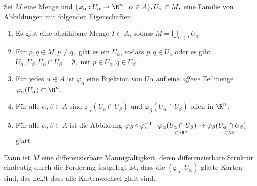 \begin{lem}
	Sei $M$ eine Menge und $ \{\varphi_\alpha: U_\alpha \to \R^n \mid \alpha \in A\}, U_\alpha \subset M, $ eine Familie von Abbildungen mit folgenden Eigenschaften:
	\begin{enumerate}[label={\roman*})]
		\item Es gibt eine abzählbare Menge $ I \subset A $, sodass $ M = \bigcup\limits_{\alpha \in I}U_\alpha. $
		\item Für $ p,q \in M, p \neq q, $ gibt es ein $ U_\alpha $, sodass $ p,q \in U_\alpha $ oder es gibt $ U_\alpha,U_\beta, U_\alpha \cap U_\beta = \emptyset, $ mit $ p \in U_\alpha, q \in U_\beta. $
		\item Für jedes $ \alpha \in A $ ist $ \varphi_\alpha $ eine Bijektion von $ U\alpha $ auf eine \emph{offene} Teilmenge $ \varphi_\alpha(U_\alpha) \subset \R^n $.
		\item Für alle $ \alpha,\beta \in A $ sind $ \varphi_\alpha(U_\alpha \cap U_\beta) $ und $ \varphi_\beta(U_\alpha \cap U_\beta) $ offen in $\R^n$.
		\item Für alle $ \alpha,\beta \in A $ ist die Abbildung $ \varphi_\beta \circ \varphi_\alpha^{-1}: \varphi_\alpha( \underset{\subset \R^n}{U_\alpha \cap U_\beta} ) \to \varphi_\beta( \underset{\subset \R^n}{U_\alpha \cap U_\beta} ) $ glatt.
	\end{enumerate}
	Dann ist $M$ eine differenzierbare Mannigfaltigkeit, deren differenzierbare Struktur eindeutig durch die Forderung festgelegt ist, dass die $ (\varphi_\alpha,U_\alpha) $ glatte Karten sind, das heißt dass alle Kartenwechsel glatt sind.
\end{lem}